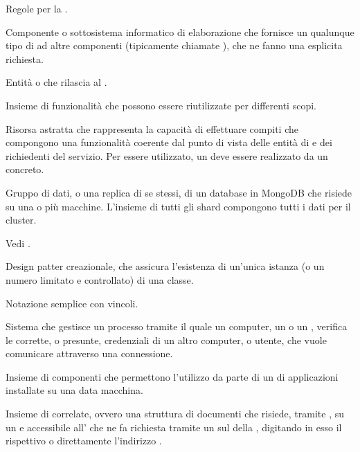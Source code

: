 {Regole per la .}

{Componente o sottosistema informatico di elaborazione che fornisce un qualunque tipo di  ad altre componenti (tipicamente chiamate ), che ne fanno una esplicita richiesta.}

{Entità  o  che rilascia  al .}

{Insieme di funzionalità  che possono essere riutilizzate per differenti scopi.}

{Risorsa astratta che rappresenta la capacità di effettuare compiti che compongono una funzionalità coerente dal punto di vista delle entità di  e dei richiedenti del servizio. Per essere utilizzato, un  deve essere realizzato da un  concreto.}

{Gruppo di dati, o una replica di se stessi, di un database in MongoDB che risiede su una o più macchine. L'insieme di tutti gli shard compongono tutti i dati per il cluster.}

{Vedi .}

{Design patter creazionale, che assicura l'esistenza di un'unica istanza (o un numero limitato e controllato) di una classe.}

{Notazione semplice con vincoli.}

{Sistema che gestisce un processo tramite il quale un computer, un  o un , verifica le corrette, o presunte, credenziali di un altro computer, o utente, che vuole comunicare attraverso una connessione.}

{Insieme di componenti  che permettono l'utilizzo da parte di un  di applicazioni installate su una data macchina.}

{Insieme di  correlate, ovvero una struttura  di documenti che risiede, tramite , su un   e accessibile all'  che ne fa richiesta tramite un  sul  della  , digitando in esso il rispettivo  o direttamente l'indirizzo .}

